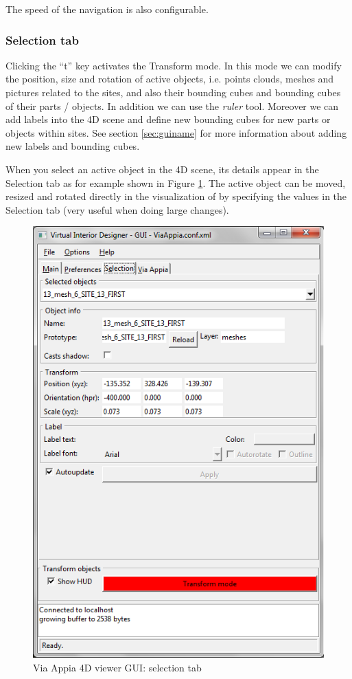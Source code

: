 \documentclass[a4paper,11pt]{article}
\begin{document}
The speed of the navigation is also configurable.

\subsubsection{Selection tab}

Clicking the ``t'' key activates the Transform mode. In this mode we can modify the position, size and rotation of active objects, i.e. points clouds, meshes and pictures related to the sites, and also their bounding cubes and bounding cubes of their parts / objects. In addition we can use the \textit{ruler} tool. Moreover we can add labels into the 4D scene and define new bounding cubes for new parts or objects within sites. See section \ref{sec:guiname} for more information about adding new labels and bounding cubes.

When you select an active object in the 4D scene, its details appear in the Selection tab as for example shown in Figure \ref{fig-guisel}. The active object can be moved, resized and rotated directly in the visualization of by specifying the values in the Selection tab (very useful when doing large changes).

\begin{figure}[!ht]
\centering
\includegraphics[scale=0.5]{fig/selection}
\caption{Via Appia 4D viewer GUI: selection tab}
\label{fig-guisel}
\end{figure}
\end{document}
